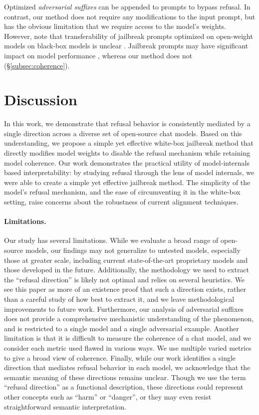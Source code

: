 \documentclass{article}
\begin{document}
Optimized \emph{adversarial suffixes} \citep{zou2023universal,andriushchenko2024jailbreaking,liao2024amplegcg} can be appended to prompts to bypass refusal.
In contrast, our method does not require any modifications to the input prompt, but has the obvious limitation that we require access to the model's weights. 
However, note that transferability of jailbreak prompts optimized on open-weight models on black-box models is unclear \citep{meade2024universal}.
Jailbreak prompts may have significant impact on model performance \citep{souly2024strongreject}, whereas our method does not (\S\ref{subsec:coherence}).

\section{Discussion}
\label{sec:discussion}

In this work, we demonstrate that refusal behavior is consistently mediated by a single direction across a diverse set of open-source chat models.
Based on this understanding, we propose a simple yet effective white-box jailbreak method that directly modifies model weights to disable the refusal mechanism while retaining model coherence. Our work demonstrates the practical utility of model-internals based interpretability:
by studying refusal through the lens of model internals, we were able to create a simple yet effective jailbreak method.
The simplicity of the model's refusal mechanism, and the ease of circumventing it in the white-box setting, raise concerns about the robustness of current alignment techniques.

\paragraph{Limitations.}

Our study has several limitations.
While we evaluate a broad range of open-source models, our findings may not generalize to untested models, especially those at greater scale, including current state-of-the-art proprietary models and those developed in the future.
Additionally, the methodology we used to extract the ``refusal direction'' is likely not optimal and relies on several heuristics. We see this paper as more of an existence proof that such a direction exists, rather than a careful study of how best to extract it, and we leave methodological improvements to future work.
Furthermore, our analysis of adversarial suffixes does not provide a comprehensive mechanistic understanding of the phenomenon, and is restricted to a single model and a single adversarial example.
Another limitation is that it is difficult to measure the coherence of a chat model, and we consider each metric used flawed in various ways. We use multiple varied metrics to give a broad view of coherence.
Finally, while our work identifies a single direction that mediates refusal behavior in each model, we acknowledge that the semantic meaning of these directions remains unclear. Though we use the term ``refusal direction'' as a functional description, these directions could represent other concepts such as ``harm'' or ``danger'', or they may even resist straightforward semantic interpretation.
\end{document}
